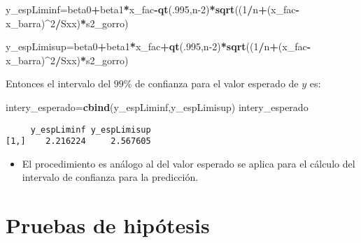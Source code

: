 \documentclass[
  a4paper,
  oneside,
  openany]{book}
\newenvironment{Shaded}{\begin{snugshade}}{\end{snugshade}}
\newcommand{\DecValTok}[1]{\textcolor[rgb]{0.00,0.00,0.81}{#1}}
\newcommand{\FunctionTok}[1]{\textcolor[rgb]{0.13,0.29,0.53}{\textbf{#1}}}
\newcommand{\NormalTok}[1]{#1}
\newcommand{\OtherTok}[1]{\textcolor[rgb]{0.56,0.35,0.01}{#1}}
\newcommand{\SpecialCharTok}[1]{\textcolor[rgb]{0.81,0.36,0.00}{\textbf{#1}}}
\providecommand{\tightlist}{%
  \setlength{\itemsep}{0pt}\setlength{\parskip}{0pt}}
\begin{document}
\begin{Shaded}
\begin{Highlighting}[]
\NormalTok{y\_espLiminf}\OtherTok{=}\NormalTok{beta0}\SpecialCharTok{+}\NormalTok{beta1}\SpecialCharTok{*}\NormalTok{x\_fac}\SpecialCharTok{{-}}\FunctionTok{qt}\NormalTok{(.}\DecValTok{995}\NormalTok{,n}\DecValTok{{-}2}\NormalTok{)}\SpecialCharTok{*}\FunctionTok{sqrt}\NormalTok{((}\DecValTok{1}\SpecialCharTok{/}\NormalTok{n}\SpecialCharTok{+}\NormalTok{(x\_fac}\SpecialCharTok{{-}}\NormalTok{x\_barra)}\SpecialCharTok{\^{}}\DecValTok{2}\SpecialCharTok{/}\NormalTok{Sxx)}\SpecialCharTok{*}\NormalTok{s2\_gorro)}

\NormalTok{y\_espLimisup}\OtherTok{=}\NormalTok{beta0}\SpecialCharTok{+}\NormalTok{beta1}\SpecialCharTok{*}\NormalTok{x\_fac}\SpecialCharTok{+}\FunctionTok{qt}\NormalTok{(.}\DecValTok{995}\NormalTok{,n}\DecValTok{{-}2}\NormalTok{)}\SpecialCharTok{*}\FunctionTok{sqrt}\NormalTok{((}\DecValTok{1}\SpecialCharTok{/}\NormalTok{n}\SpecialCharTok{+}\NormalTok{(x\_fac}\SpecialCharTok{{-}}\NormalTok{x\_barra)}\SpecialCharTok{\^{}}\DecValTok{2}\SpecialCharTok{/}\NormalTok{Sxx)}\SpecialCharTok{*}\NormalTok{s2\_gorro)}
\end{Highlighting}
\end{Shaded}

Entonces el intervalo del \(99\%\) de confianza para el valor esperado de \(y\) es:

\begin{Shaded}
\begin{Highlighting}[]
\NormalTok{intery\_esperado}\OtherTok{=}\FunctionTok{cbind}\NormalTok{(y\_espLiminf,y\_espLimisup) }
\NormalTok{intery\_esperado}
\end{Highlighting}
\end{Shaded}

\begin{verbatim}
     y_espLiminf y_espLimisup
[1,]    2.216224     2.567605
\end{verbatim}

\begin{itemize}
\tightlist
\item
  El procedimiento es análogo al del valor esperado se aplica para el cálculo del intervalo de confianza para la predicción.
\end{itemize}

\hypertarget{pruebas-de-hipuxf3tesis}{%
\chapter{Pruebas de hipótesis}\label{pruebas-de-hipuxf3tesis}}
\end{document}
